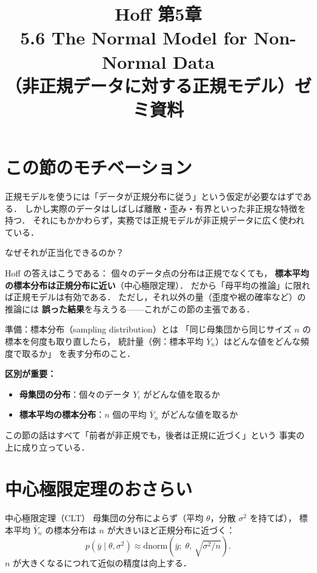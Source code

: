 \documentclass[lualatex,ja=standard,a4paper,12pt]{bxjsarticle}
\title{{\large Hoff 第5章} \\[6pt]
       \textbf{5.6\; The Normal Model for Non-Normal Data} \\[4pt]
       {\normalsize （非正規データに対する正規モデル）ゼミ資料}}
\author{}
\date{}
\begin{document}
\maketitle
\thispagestyle{empty}

\section{この節のモチベーション}

正規モデルを使うには「データが正規分布に従う」という仮定が必要なはずである．
しかし実際のデータはしばしば離散・歪み・有界といった非正規な特徴を持つ．
それにもかかわらず，実務では正規モデルが非正規データに広く使われている．

\medskip
なぜそれが正当化できるのか？

\medskip
Hoff の答えはこうである：
個々のデータ点の分布は正規でなくても，
\textbf{標本平均の標本分布は正規分布に近い}（中心極限定理）．
だから「母平均の推論」に限れば正規モデルは有効である．
ただし，それ以外の量（歪度や裾の確率など）の推論には
\textbf{誤った結果}を与えうる——これがこの節の主張である．

\begin{defbox}{準備：標本分布（sampling distribution）とは}
「同じ母集団から同じサイズ $n$ の標本を何度も取り直したら，
統計量（例：標本平均 $\bar{Y}_n$）はどんな値をどんな頻度で取るか」
を表す分布のこと．

\medskip
\textbf{区別が重要：}
\begin{itemize}
  \item \textbf{母集団の分布}：個々のデータ $Y_i$ がどんな値を取るか
  \item \textbf{標本平均の標本分布}：$n$ 個の平均 $\bar{Y}_n$ がどんな値を取るか
\end{itemize}
この節の話はすべて「前者が非正規でも，後者は正規に近づく」という
事実の上に成り立っている．
\end{defbox}

\section{中心極限定理のおさらい}

\begin{thmbox}{中心極限定理（CLT）}
母集団の分布によらず（平均 $\theta$，分散 $\sigma^2$ を持てば），
標本平均 $\bar{Y}_n$ の標本分布は $n$ が大きいほど正規分布に近づく：
\[
  p(\bar{y} \mid \theta, \sigma^2)
  \approx \mathrm{dnorm}\!\left(\bar{y};\; \theta,\, \sqrt{\sigma^2/n}\right).
\]
$n$ が大きくなるにつれて近似の精度は向上する．
\end{thmbox}
\end{document}
